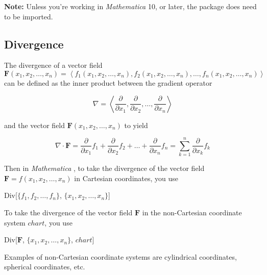 \documentclass[11pt,letterpaper,twoside,titlepage]{book}
\newcommand{\Mathematica}{\textit{Mathematica} }
\begin{document}
				\textbf{Note:} Unless you're working in \Mathematica 10, or later, the package does need to be imported.
				
				\subsection{Divergence}
				
					The divergence of a vector field $ \mathbf{F}(x_1, x_2, \ldots, x_n) = \left\langle f_1(x_1, x_2, \ldots, x_n), f_2(x_1, x_2, \ldots, x_n), \ldots, f_n(x_1, x_2, \ldots, x_n) \right\rangle $ can be defined as the inner product between the gradient operator
					
					\[ \nabla = \left\langle \frac{\partial}{\partial x_1}, \frac{\partial}{\partial x_2}, \ldots, \frac{\partial}{\partial x_n} \right\rangle \]
					
					and the vector field $ \mathbf{F}(x_1, x_2, \ldots, x_n) $ to yield
					
					\[ \nabla \cdot \mathbf{F} = \frac{\partial}{\partial x_1} f_1 + \frac{\partial}{\partial x_2} f_2 + \dots + \frac{\partial}{\partial x_n} f_n = \sum_{k = 1}^n \frac{\partial}{\partial x_k} f_k \]
					
					Then in \Mathematica, to take the divergence of the vector field $ \mathbf{F} = f(x_1, x_2, \ldots, x_n)$ in Cartesian coordinates, you use
					
%					
%						
%						
					
					\begin{center}
					
						Div[$\{ f_1, f_2, \ldots, f_n \}$, $\{ x_1, x_2, \ldots, x_n \}$]
					
					\end{center}
					
					To take the divergence of the vector field $\mathbf{F}$ in the non-Cartesian coordinate system $chart$, you use
					
					\begin{center}
					
						Div[$\mathbf{F}$, $\{ x_1, x_2, \ldots, x_n \}$, $chart$]
					
					\end{center}
					
					Examples of non-Cartesian coordinate systems are cylindrical coordinates, spherical coordinates, etc.
				
\end{document}
